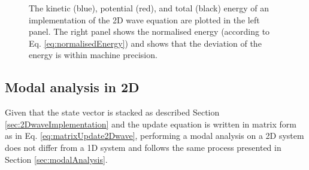 \begin{figure}[h]
    \centering
      \caption{The kinetic (blue), potential (red), and total (black) energy of an implementation of the 2D wave equation are plotted in the left panel. The right panel shows the normalised energy (according to Eq. \eqref{eq:normalisedEnergy}) and shows that the deviation of the energy is within machine precision. \label{fig:energy2Dwave}}
\end{figure}

\subsection{Modal analysis in 2D}
Given that the state vector is stacked as described Section \ref{sec:2DwaveImplementation} and the update equation is written in matrix form as in Eq. \eqref{eq:matrixUpdate2Dwave}, performing a modal analysis on a 2D system does not differ from a 1D system and follows the same process presented in Section \ref{sec:modalAnalysis}.

